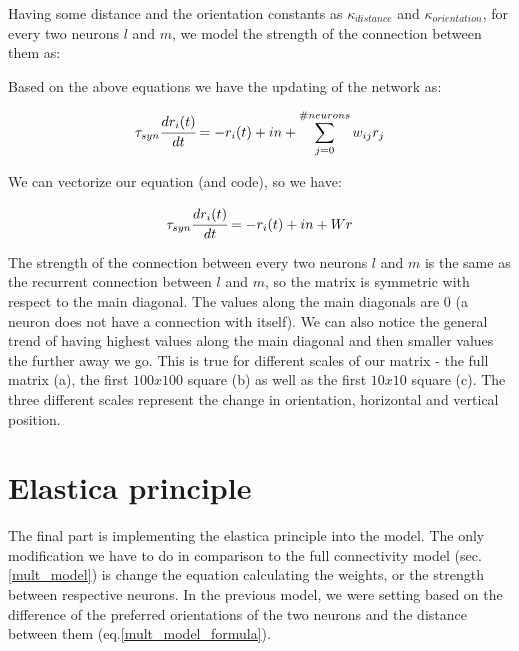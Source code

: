 Having some distance and the orientation constants as $\kappa_{distance}$ and $\kappa_{orientation}$, for every two neurons $l$ and $m$, we model the strength of the connection between them as:





Based on the above equations we have the updating of the network as:

\begin{equation}
\tau_{syn}\cfrac{dr_{i}(t)}{dt}=-r_{i}(t)+in+\sum_{j=0}^{\#neurons}w_{ij}r_{j}
\end{equation}

We can vectorize our equation (and code), so we have:

\begin{equation}
\tau_{syn}\cfrac{dr_{i}(t)}{dt}=-r_{i}(t)+in+Wr
\end{equation}

The strength of the connection between every two neurons $l$ and $m$ is the same as the recurrent connection between $l$ and $m$, so the matrix is symmetric with respect to the main diagonal. The values along the main diagonals are $0$ (a neuron does not have a connection with itself). We can also notice the general trend of having highest values along the main diagonal and then smaller values the further away we go. This is true for different scales of our matrix - the full matrix (a), the first $100x100$ square (b) as well as the first $10x10$ square (c). The three different scales represent the change in orientation, horizontal and vertical position.




\section{Elastica principle}

The final part is implementing the elastica principle into the model. The only modification we have to do in comparison to the full connectivity model (sec.\ref{mult_model}) is change the equation calculating the weights, or the strength between respective neurons. In the previous model, we were setting based on the difference of the preferred orientations of the two neurons and the distance between them (eq.\ref{mult_model_formula}).






